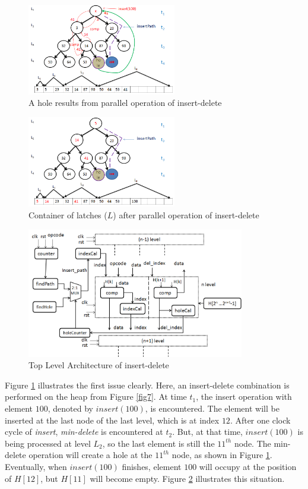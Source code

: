 \documentclass[10pt, conference, compsocconf]{IEEEtran}
\begin{document}
\begin{figure}[!ht]
  \centering
  \includegraphics[width=6.5cm]{Figures/8.png}
      \caption{A hole results from parallel operation of insert-delete}
    \label{fig8}
\end{figure}

\begin{figure}[!ht]
  \centering
  \includegraphics[width=6.5cm]{Figures/9.png}
      \caption{Container of latches ($L$) after parallel operation of insert-delete}
    \label{fig9}
\end{figure}

\begin{figure}[!ht]
  \centering
  \includegraphics[width=9.5cm]{Figures/2.png}
      \caption{Top Level Architecture of insert-delete}
    \label{fig10}
\end{figure}

Figure \ref{fig8} illustrates the first issue clearly.
Here, an insert-delete combination is performed on the heap from Figure \ref{fig7}.
At time $t_1$, the insert operation with element $100$, denoted by $insert(100)$, is encountered.
The element will be inserted at the last node of the last level, which is at index $12$.
After one clock cycle of {\it insert}, {\it min-delete} is encountered at $t_2$.
But, at that time, $insert(100)$ is being processed at level $L_2$, so the last element is still the $11^{th}$ node.
The min-delete operation will create a hole at the $11^{th}$ node, as shown in Figure \ref{fig8}.
Eventually, when $insert(100)$ finishes, element $100$ will occupy at the position of $H[12]$, but $H[11]$ will become empty.
Figure \ref{fig9} illustrates this situation.
\end{document}
